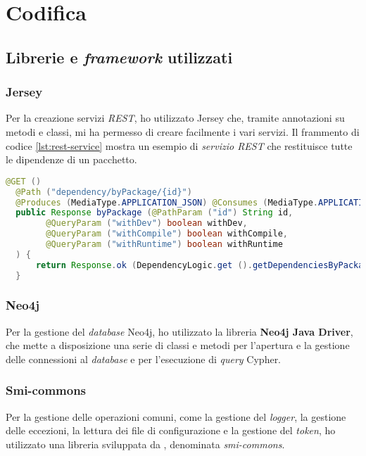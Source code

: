 
\section{Codifica}
\subsection*{Librerie e \textit{framework} utilizzati}
\subsubsection*{Jersey}
Per la creazione servizi \textit{REST}, ho utilizzato Jersey che, tramite annotazioni su metodi e classi, 
mi ha permesso di creare facilmente i vari servizi.
Il frammento di codice \ref*{lst:rest-service} mostra un esempio di \textit{servizio REST} che restituisce tutte le dipendenze di un pacchetto.\\
\begin{lstlisting}[language=Java, caption={Esempio di \textit{servizio REST} utilizzando Jersey.},captionpos=b, label={lst:rest-service}]
  @GET ()
  @Path ("dependency/byPackage/{id}")
  @Produces (MediaType.APPLICATION_JSON) @Consumes (MediaType.APPLICATION_JSON)
  public Response byPackage (@PathParam ("id") String id, 
        @QueryParam ("withDev") boolean withDev, 
        @QueryParam ("withCompile") boolean withCompile, 
        @QueryParam ("withRuntime") boolean withRuntime
  ) {
      return Response.ok (DependencyLogic.get ().getDependenciesByPackage (id, withDev, withCompile, withRuntime)).build ();
  }
\end{lstlisting}

\subsubsection*{Neo4j}
Per la gestione del \textit{database} Neo4j, ho utilizzato la libreria \textbf{Neo4j Java Driver}, 
che mette a disposizione una serie di classi e metodi per l'apertura e la gestione delle connessioni al \textit{database} e 
per l'esecuzione di \textit{query} Cypher.\\

\subsubsection*{Smi-commons}
Per la gestione delle operazioni comuni, come la gestione del \textit{logger}, la gestione delle eccezioni, la lettura dei 
file di configurazione e la gestione del \textit{token}, ho utilizzato una libreria sviluppata da \azienda{}, denominata \textit{smi-commons}.\\

